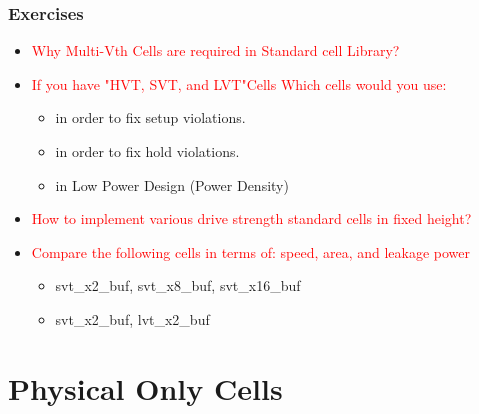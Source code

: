 \documentclass{beamer}
\begin{document}
	\begin{frame}
	\frametitle{Exercises}
	\begin{itemize}
		\item \textcolor {red} {Why Multi-Vth Cells are required in Standard cell Library?}
		\item \textcolor {red} {If you have "HVT, SVT, and LVT"Cells Which cells would you use: }
		\begin{itemize}
			\item in order to fix setup violations.
			\item in order to fix hold violations.
			\item in Low Power Design (Power Density)
		\end{itemize}
		\item \textcolor {red} {How to implement various drive strength standard cells in fixed height?}
		\item \textcolor {red} {Compare the following cells in terms of: speed, area, and leakage power}
		\begin{itemize}
			\item svt\_x2\_buf, svt\_x8\_buf, svt\_x16\_buf
			\item svt\_x2\_buf, lvt\_x2\_buf 
		\end{itemize}
	\end{itemize}
\end{frame}
	
	\section{Physical Only Cells}
	
\end{document}
